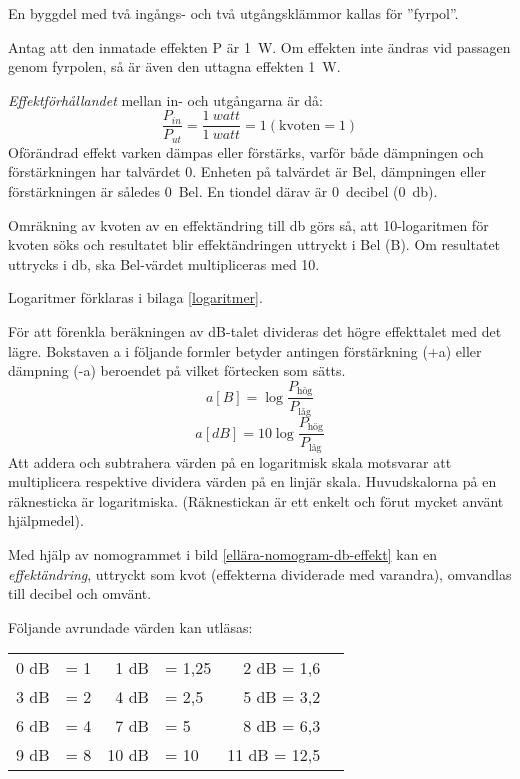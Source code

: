 En byggdel med två ingångs- och två utgångsklämmor kallas för ''fyrpol''.


Antag att den inmatade effekten P är \SI{1}{\watt}.
Om effekten inte ändras vid passagen genom fyrpolen, så är även den uttagna
effekten \SI{1}{\watt}.

\emph{Effektförhållandet} mellan in- och utgångarna är då:
\[\dfrac{P_{in}}{P_{ut}} = \dfrac{1\ \textit{watt}}{1\ \textit{watt}} = 1 (\text{kvoten} = 1)\]
Oförändrad effekt varken dämpas eller förstärks, varför både dämpningen och
förstärkningen har talvärdet 0.
Enheten på talvärdet är Bel, dämpningen eller förstärkningen är således 0~Bel.
En tiondel därav är 0~decibel (\SI{0}{\decibel}).

Omräkning av kvoten av en effektändring till \si{\decibel} görs så, att
10-logaritmen för kvoten söks och resultatet blir effektändringen uttryckt i Bel
(B).
Om resultatet uttrycks i \si{\decibel}, ska Bel-värdet multipliceras med 10.

Logaritmer förklaras i bilaga \ref{logaritmer}.

För att förenkla beräkningen av dB-talet divideras det högre effekttalet med det
lägre.
Bokstaven a i följande formler betyder antingen förstärkning (+a) eller
dämpning (-a) beroendet på vilket förtecken som sätts.
\[a[B] = \log \dfrac{P_\text{hög}}{P_\text{låg}}\]
\[a[dB] = 10\log \dfrac{P_\text{hög}}{P_\text{låg}}\]
Att addera och subtrahera värden på en logaritmisk skala motsvarar att
multiplicera respektive dividera värden på en linjär skala.
Huvudskalorna på en räknesticka är logaritmiska.
(Räknestickan är ett enkelt och förut mycket använt hjälpmedel).

Med hjälp av nomogrammet i bild \ref{ellära-nomogram-db-effekt} kan en
\emph{effektändring}, uttryckt som kvot (effekterna dividerade med varandra),
omvandlas till decibel och omvänt.


Följande avrundade värden kan utläsas:

\begin{center}
\begin{tabular}{rlrlrl}
0 dB & = 1 &  1 dB & =  1,25 & 2 dB = 1,6 \\
3 dB & = 2 &  4 dB & =  2,5  & 5 dB = 3,2 \\
6 dB & = 4 &  7 dB & =  5    & 8 dB = 6,3 \\
9 dB & = 8 & 10 dB & = 10    & 11 dB = 12,5
\end{tabular}
\end{center}

